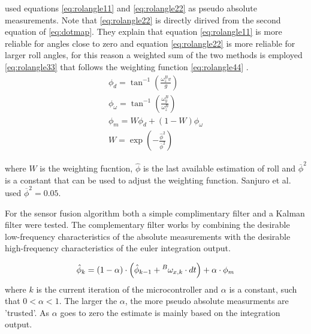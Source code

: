 \citet{sanjurjo2018roll} used equations \ref{eq:rolangle11} and \ref{eq:rolangle22}  as pseudo absolute measurements. Note that \ref{eq:rolangle22} is directly dirived from the second equation of \ref{eq:dotmap}.    They explain that equation \ref{eq:rolangle11} is more reliable for  angles close to zero and equation \ref{eq:rolangle22} is more reliable for larger roll angles, for this reason  a weighted sum of the two methods is employed \ref{eq:rolangle33} that follows the weighting function \ref{eq:rolangle44} .
\begin{align}
      \phi_{d}=\tan^{-1}\left(\frac{\omega_{z}^{B} v}{g}\right) \label{eq:rolangle11}
    \\
      \phi_{\omega}=\tan^{-1} \left(\frac{\omega_{y}^{B}}{\omega_{z}^{B}}\right)\label{eq:rolangle22}
      \\
      \phi_{m}=W \phi_{d}+(1-W) \phi_{\omega} \label{eq:rolangle33} 
      \\
      W=\exp \left(-\frac{\hat{\phi}^{2}}{\overline{\phi}^{2}}\right)
  \label{eq:rolangle44}
\end{align}

where \ensuremath{W } is the weighting fucntion,  \ensuremath{\hat{\phi}} is the last available estimation of roll and \ensuremath{\overline{\phi}^2} is a constant that can be used to adjust the weighting function. Sanjuro et al. used  \ensuremath{\overline{\phi}^2=0.05}.

For the sensor fusion algorithm both a simple complimentary filter and a Kalman filter were tested. The complementary filter works by combining the desirable low-frequency characteristics of the absolute measurements with the desirable high-frequency characteristics of the euler integration output. 

\begin{equation}
    \hat{\phi}_{k}=(1-\alpha) \cdot\left(\hat{\phi}_{k-1}+\prescript{B}{}{\omega_{x,k}} \cdot dt\right)+\alpha \cdot {\phi}_{m}
\end{equation}
where \ensuremath{k} is the current iteration of the microcontroller and \ensuremath{\alpha} is a constant, such that \ensuremath{0<\alpha<1}. The larger the \ensuremath{\alpha}, the more pseudo absolute measurments are 'trusted'. As \ensuremath{\alpha} goes to zero the estimate is mainly based on the integration output. 

